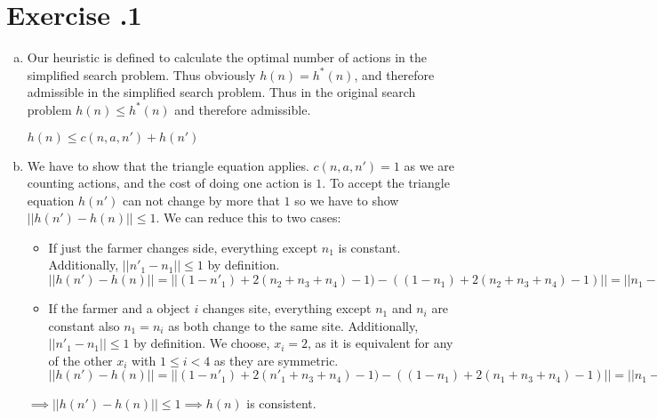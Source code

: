 \documentclass[11pt]{scrartcl}
\newcounter{sheetnr}
\newenvironment{exercise}[2][]{\section*{Exercise \thesheetnr.#2\expandafter\ifstrempty\expandafter{#1}{}{\ (#1)}}}{}
\newenvironment{subexercises}{\begin{enumerate}[a), font=\bfseries, wide, labelindent=0pt]}{\end{enumerate}}
\begin{document}
\begin{exercise}[Heuristics]{1}
\begin{subexercises}
            \begin{itemize}
                \item $(1-n_1) = 1$ when the farmer is on the goal shore and thus has to go back and get another object from the starting shore. $(1-n_1) = 0$ if he is already on the starting shore and thus doesn't have to travel back to the starting shore to get another object.
                \item $2(n_2 + n_3 + n_4) - 1$: for each object he brings from the starting shore he has to travel back except for the last one he brings to the other side.
            \end{itemize}
        
            \item Our heuristic is defined to calculate the optimal number of actions in the simplified search problem. Thus obviously $h(n) = h^*(n)$, and therefore admissible in the simplified search problem. Thus in the original search problem $h(n) \leq h^*(n)$ and therefore admissible.
        
            \begin{center}
                $h(n) \leq c(n,a,n') + h(n')$
            \end{center}
        
            \item We have to show that the triangle equation applies. $c(n,a,n') = 1$ as we are counting actions, and the cost of doing one action is $1$. To accept the triangle equation $h(n')$ can not change by more that $1$ so we have to show $||h(n') - h(n)|| \leq 1$. We can reduce this to two cases:
            \begin{itemize}
                \item If just the farmer changes side, everything except $n_1$ is constant. Additionally, $||{n'}_1 - n_1 || \leq 1$ by definition. \\
                $||h(n') - h(n)|| = ||(1 - {n'}_1) + 2(n_2 + n_3 + n_4) - 1) - ((1 - n_1) + 2(n_2 + n_3 + n_4) - 1)|| = ||n_1 - {n'}_1|| \leq 1$ \\
                \item If the farmer and a object $i$ changes site, 
                everything except $n_1$ and $n_i $ are constant also $n_1 = n_i$ as both change to the same site. Additionally, $||{n'}_1 - n_1 || \leq 1$ by definition. We choose, $x_i = 2$, as it is equivalent for any of the other $x_i$ with $1 \leq i < 4$ as they are symmetric. \\
                $||h(n') - h(n)|| = ||(1 - {n'}_1) + 2({n'}_1 + n_3 + n_4) - 1) - ((1 - n_1) + 2(n_1 + n_3 + n_4) - 1)|| = ||n_1 - {n'}_1 + 2{n'}_1 - 2n_1 || = || n_1 - {n'}_1 || = 1$ \\
            \end{itemize}
        
            $\implies ||h(n') - h(n)|| \leq 1 \implies h(n)$ is consistent.
        
            
        
        
        \end{subexercises}
    \end{exercise}
\end{document}
